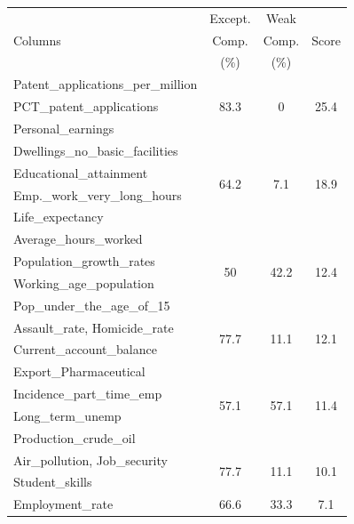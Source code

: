 \begin{table}[!ht]
    \centering
    \small
    \begin{tabular}{p{4cm} c c c} 
        \hline
        \multirow{3}{*}{Columns}  & Except. & Weak  & \multirow{3}{*}{Score}\\
                                  & Comp.   & Comp.& \\
                                  & (\%)    & (\%)& \\
        \hline
        Patent\_applications\_per\_million & \multirow{3}{*}{83.3}
        &\multirow{3}{*}{0} & \multirow{3}{*}{25.4} \\
        PCT\_patent\_applications&&&\\
        Personal\_earnings &&&\\
        \hline
        Dwellings\_no\_basic\_facilities&
        \multirow{4}{*}{64.2} &\multirow{4}{*}{7.1} & \multirow{4}{*}{18.9} \\
        Educational\_attainment&&&\\
        Emp.\_work\_very\_long\_hours&&&\\
        Life\_expectancy&&&\\
        \hline
        Average\_hours\_worked&
        \multirow{4}{*}{50} &\multirow{4}{*}{42.2} & \multirow{4}{*}{12.4} \\
        Population\_growth\_rates&&&\\ 
        Working\_age\_population&&&\\
        Pop\_under\_the\_age\_of\_15&&&\\
        \hline
        Assault\_rate, Homicide\_rate &
        \multirow{2}{*}{77.7} &\multirow{2}{*}{11.1} & \multirow{2}{*}{12.1} \\
        Current\_\-account\_balance&&&\\
        \hline
        Export\_Pharmaceutical&
        \multirow{4}{*}{57.1} &\multirow{4}{*}{57.1} & \multirow{4}{*}{11.4} \\
        Incidence\_part\_time\_emp&&&\\ 
        Long\_term\_unemp&&&\\ 
        Production\_crude\_oil&&&\\ 
        \hline
        Air\_pollution, Job\_security&
        \multirow{2}{*}{77.7} &\multirow{2}{*}{11.1} & \multirow{2}{*}{10.1} \\
        Student\_skills&&&\\
        \hline
        Employment\_rate&
        \multirow{3}{*}{66.6} &\multirow{3}{*}{33.3} & \multirow{3}{*}{7.1} \\

\end{tabular}
\end{table}
